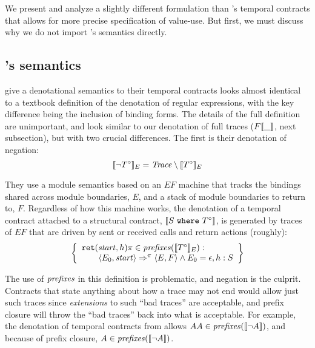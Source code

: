 
We present and analyze a slightly different formulation than \dfm's temporal contracts that allows for more precise specification of value-use.
%
But first, we must discuss why we do not import \dfm's semantics directly.
%
\subsection{\dfm's semantics}

\dfm{} give a denotational semantics to their temporal contracts looks almost identical to a textbook definition of the denotation of regular expressions, with the key difference being the inclusion of binding forms.
%
The details of the full definition are unimportant, and look similar to our denotation of full traces ($F[\![ \_ ]\!]$, next subsection), but with two crucial differences.
%
The first is their denotation of negation:
\newcommand{\denotedfm}[2]{\denote{#1}_{#2}}
\begin{equation*}
  \denotedfm{\stnot{\motcon}}{E} = \mathit{Trace} \setminus \denotedfm{\motcon}{E}
\end{equation*}

They use a module semantics based on an $\mathit{EF}$ machine that tracks the bindings shared across module boundaries, $E$, and a stack of module boundaries to return to, $F$.
%
Regardless of how this machine works, the denotation of a temporal contract attached to a structural contract, $[\![ S\ {\tt where}\ T^\circ ]\!]$, is generated by traces of $\mathit{EF}$ that are driven by sent or received calls and return actions (roughly):
\begin{align*}
 \left\{
   \begin{array}{l}
    {\tt ret}(\mathit{start},h)\mtrace \in \prefixes(\denotedfm{\motcon}{E}) :
 \\ \qquad\langle E_0, \mathit{start}\rangle \Rightarrow^\mtrace \langle E, F\rangle \wedge E_0 = \epsilon, h : S
\end{array}\right\}
\end{align*}

The use of $\mathit{prefixes}$ in this definition is problematic, and negation is the culprit.
%
Contracts that state anything about how a trace may not end would allow just such traces since \emph{extensions} to such ``bad traces'' are acceptable, and prefix closure will throw the ``bad traces'' back into what is acceptable.
%
%
For example, the denotation of temporal contracts from \dfm{} allows $AA \in \mathit{prefixes}([\![ \neg A ]\!])$, and because of prefix closure, $A \in \mathit{prefixes}([\![ \neg A ]\!])$.


